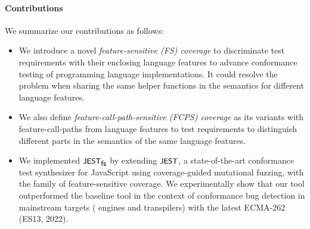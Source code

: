\paragraph{\textbf{Contributions}}
%
We summarize our contributions as follows:
%
\begin{itemize}

  \item
    We introduce a novel \textit{feature-sensitive (FS) coverage} to discriminate
    test requirements with their enclosing language features to advance
    conformance testing of programming language implementations.
    It could resolve the problem when sharing the same helper
    functions in the semantics for different language features.
  \item 
    We also define \textit{feature-call-path-sensitive (FCPS) coverage} as its
    variants with feature-call-paths from language features to test requirements
    to distinguish different parts in the semantics of the same language
    features.

  \item
    We implemented $\textsf{\small JEST}_{\textsf{\small fs}}$ by extending $\textsf{\small JEST}$, a state-of-the-art conformance
    test synthesizer for JavaScript using coverage-guided mutational fuzzing,
    with the family of feature-sensitive coverage.
    We experimentally show that our tool outperformed the baseline tool in the
    context of conformance bug detection in  mainstream targets
    ( engines and  transpilers) with the latest ECMA-262
    (ES13, 2022).
\end{itemize}
